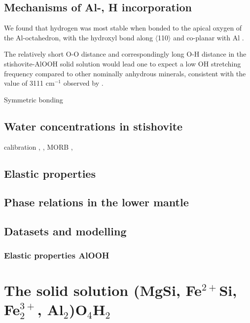 \documentclass[review]{elsarticle}
\begin{document}


\subsection{Mechanisms of Al-, H incorporation}
We found that hydrogen was most stable when bonded to the apical oxygen of the Al-octahedron, with the hydroxyl bond along $\langle$110$\rangle$ and co-planar with Al \citep{PS2004}.

The relatively short O-O distance and correspondingly long O-H distance in the stishovite-AlOOH solid solution would lead one to expect a low OH stretching frequency compared to other nominally anhydrous minerals, consistent with the value of 3111 cm$^{-1}$ observed by \cite{PMH1993}.

Symmetric bonding \citep{PS2004}






\subsection{Water concentrations in stishovite}
\cite{PMH1993} calibration
\cite{PBJ2003}
\cite{BBB2006},  
\cite{LKSOLBI2007},
MORB \cite{CK2002},


\subsection{Elastic properties}
\cite{AAMB2003}
\cite{Lakshtanovetal2005}
\cite{OSHKKK2002}
\cite{SKNNFUIOY2009}

\subsection{Phase relations in the lower mantle}
\cite{IR1993}
\cite{Wood2000}
\cite{Hirose2002}
\cite{Walteretal2015}
\cite{LO2005}

\subsection{Datasets and modelling}
\cite{HP2011}
\cite{SLB2011}
\cite{CHRU2014}

\subsubsection{Elastic properties AlOOH}
\cite{Suzuki2009}
\citep{SKVO2008}
\cite{VOK2002}
\cite{TT2009}
\cite{LAJ2006}

\section{The solid solution (MgSi, Fe$^{2+}$Si, Fe$^{3+}_2$, Al$_2$)O$_4$H$_2$}
\end{document}
